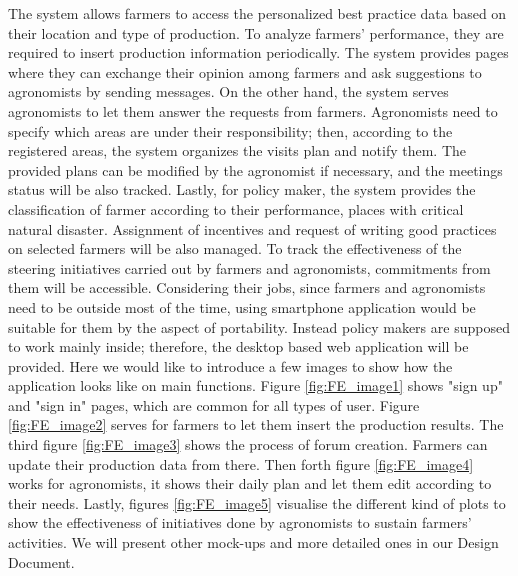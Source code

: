 
The system allows farmers to access the personalized best practice data based on their location and type of production. To analyze farmers' performance, they are required to insert production information periodically. The system provides pages where they can exchange their opinion among farmers and ask suggestions to agronomists by sending messages. 
\newline
\newline
On the other hand, the system serves agronomists to let them answer the requests from farmers. 
Agronomists need to specify which areas are under their responsibility; then, according to the registered areas, the system organizes the visits plan and notify them. The provided plans can be modified by the agronomist if necessary, and the meetings status will be also tracked.
\newline
\newline
Lastly, for policy maker, the system provides the classification of farmer according to their performance, places with critical natural disaster. Assignment of incentives and request of writing good practices on selected farmers will be also managed. To track the effectiveness of the steering initiatives carried out by farmers and agronomists, commitments from them will be accessible.
\newline
\newline
Considering their jobs, since farmers and agronomists need to be outside most of the time, using smartphone application would be suitable for them by the aspect of portability. Instead policy makers are supposed to work mainly inside; therefore, the desktop based web application will be provided. 
\newline
\newline
Here we would like to introduce a few images to show how the application looks like on main functions. Figure \ref{fig:FE_image1} shows "sign up" and "sign in" pages, which are common for all types of user. Figure \ref{fig:FE_image2} serves for farmers to let them insert the production results. The third figure \ref{fig:FE_image3} shows the process of forum creation. Farmers can update their production data from there.
Then forth figure \ref{fig:FE_image4} works for agronomists, it shows their daily plan and let them edit according to their needs. Lastly, figures \ref{fig:FE_image5} visualise the different kind of plots to show the effectiveness of initiatives done by agronomists to sustain farmers' activities. We will present other mock-ups and more detailed ones in our Design Document. 

